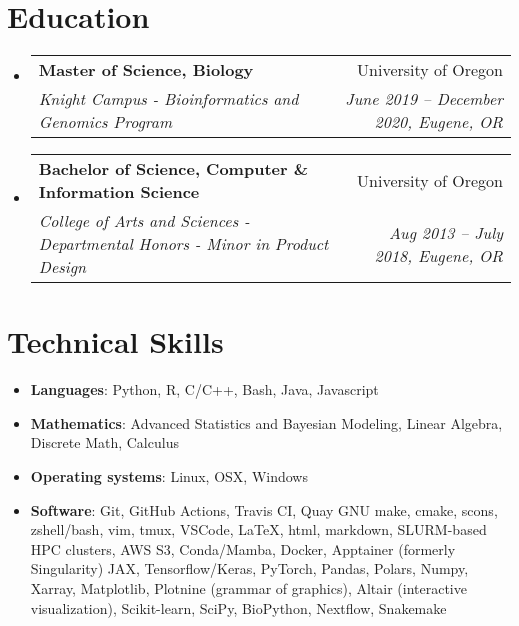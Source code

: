\documentclass[letterpaper,9pt]{article}
\makeatletter
\newcommand{\resumeNoWrapItem}[2]{
  \item\small{
    \textbf{#1}{: #2 \vspace{-2pt}}
  }
}
\newcommand{\resumeSubheading}[4]{
  \vspace{-1pt}\item
    \begin{tabular*}{0.97\textwidth}[t]{l@{\extracolsep{\fill}}r}
      \textbf{#1} & #2 \\
      \textit{\small#3} & \textit{\small #4} \\
    \end{tabular*}\vspace{-3pt}
}
\newcommand{\resumeSubItem}[2]{\resumeNoWrapItem{#1}{#2}\vspace{-2pt}}
\newcommand{\resumeSubHeadingListStart}{\begin{itemize}[leftmargin=*]}
\newcommand{\resumeSubHeadingListEnd}{\end{itemize}}
\makeatother
\begin{document}
\section{Education}
    \resumeSubHeadingListStart
        \resumeSubheading
            {Master of Science, Biology}{University of Oregon}
            {Knight Campus - Bioinformatics and Genomics Program}{June 2019 -- December 2020, Eugene, OR}
        \resumeSubheading
            {Bachelor of Science, Computer \& Information Science}{University of Oregon}
            {College of Arts and Sciences - Departmental Honors - Minor in Product Design}{Aug 2013 -- July 2018, Eugene, OR}
    \resumeSubHeadingListEnd

\section{Technical Skills}

\resumeSubHeadingListStart
    \resumeSubItem{Languages}
        {
            Python, R, C/C++, Bash, Java, Javascript
        }
    \resumeSubItem{Mathematics}
        {
            Advanced Statistics and Bayesian Modeling, 
            Linear Algebra, 
            Discrete Math, 
            Calculus
        }
    \resumeSubItem{Operating systems}
        {
            Linux, OSX, Windows
        }
    \resumeSubItem{Software}
        {
            Git, GitHub Actions, Travis CI, Quay %
            GNU make, cmake, scons, %
            zshell/bash, vim, tmux, %
            VSCode,
            \LaTeX, html, markdown,
            SLURM-based HPC clusters, 
            AWS S3, %
            Conda/Mamba, %
            Docker, Apptainer (formerly Singularity) %
            JAX, Tensorflow/Keras, PyTorch, 
            Pandas, Polars, Numpy, Xarray, 
            Matplotlib, Plotnine (grammar of graphics), Altair (interactive visualization),
            Scikit-learn, SciPy, BioPython,
            Nextflow, Snakemake
        }
\resumeSubHeadingListEnd

    
\end{document}
